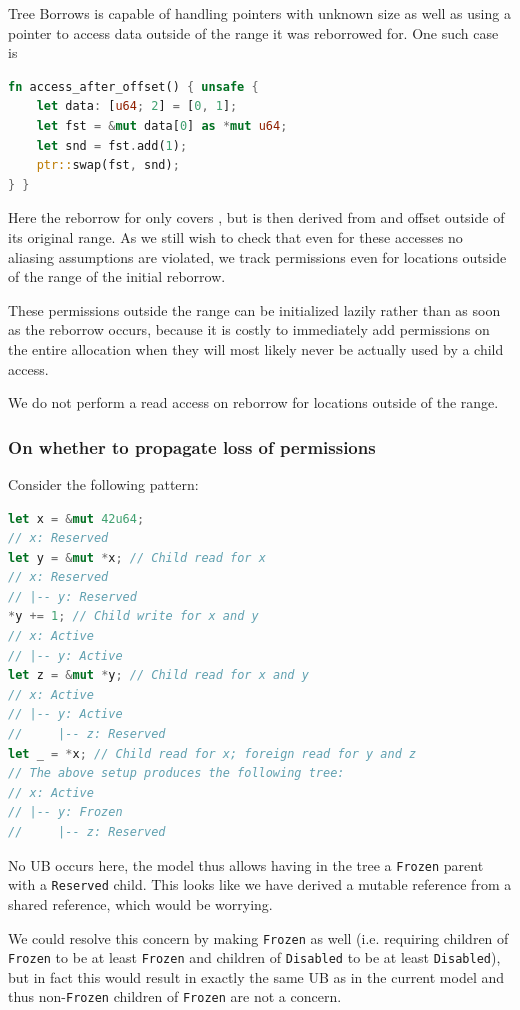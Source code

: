 \documentclass[a4paper,11pt]{article}
\theoremstyle{plain}
\theoremstyle{definition}
\theoremstyle{remark}
\newcommand{\tcode}[1]{\rstinline{#1}}
\newcommand{\tperm}[1]{\texttt{#1}}
\begin{document}
Tree Borrows is capable of handling pointers with unknown size as well as using
a pointer to access data outside of the range it was reborrowed for. One such case is
\begin{lstlisting}[language=rust]
fn access_after_offset() { unsafe {
    let data: [u64; 2] = [0, 1];
    let fst = &mut data[0] as *mut u64;
    let snd = fst.add(1);
    ptr::swap(fst, snd);
} }
\end{lstlisting}
Here the reborrow for \tcode{fst} only covers \tcode{data[0]}, but \tcode{snd} is then derived from
\tcode{fst} and offset outside of its original range. As we still wish to check
that even for these accesses no aliasing assumptions are violated, we track
permissions even for locations outside of the range of the initial reborrow.

These permissions outside the range can be initialized lazily rather than as soon
as the reborrow occurs, because it is costly to immediately add permissions
on the entire allocation when they will most likely never be actually used by
a child access.

We do not perform a read access on reborrow for locations outside of the range.

\subsubsection{On whether to propagate loss of permissions}

Consider the following pattern:
\begin{lstlisting}[language=rust]
let x = &mut 42u64;
// x: Reserved
let y = &mut *x; // Child read for x
// x: Reserved
// |-- y: Reserved
*y += 1; // Child write for x and y
// x: Active
// |-- y: Active
let z = &mut *y; // Child read for x and y
// x: Active
// |-- y: Active
//     |-- z: Reserved
let _ = *x; // Child read for x; foreign read for y and z
// The above setup produces the following tree:
// x: Active
// |-- y: Frozen
//     |-- z: Reserved
\end{lstlisting}
No UB occurs here, the model thus allows having in the tree a \tperm{Frozen} parent with a \tperm{Reserved} child.
This looks like we have derived a mutable reference from a shared reference, which would
be worrying.

We could resolve this concern by making \tcode{z} \tperm{Frozen} as well (i.e. requiring
children of \tperm{Frozen} to be at least \tperm{Frozen} and children of \tperm{Disabled} to be
at least \tperm{Disabled}), but in fact this would result in exactly the same
UB as in the current model and thus non-\tperm{Frozen} children of \tperm{Frozen} are not
a concern.
\end{document}
